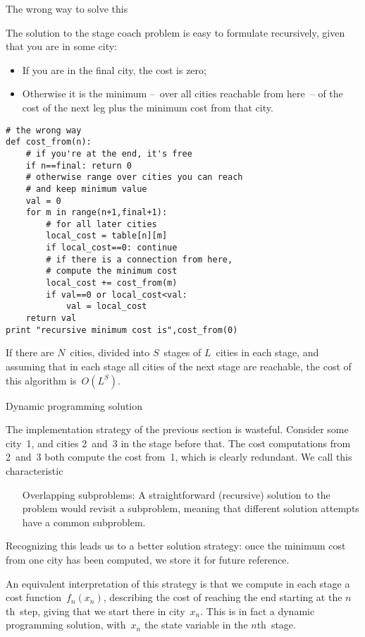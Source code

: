  {The wrong way to solve this}

The solution to the stage coach problem is easy to formulate
recursively, given that you are in some city:
\begin{itemize}
\item If you are in the final city, the cost is zero;
\item Otherwise it is the minimum --~over all cities reachable from here~--
  of the cost of the next leg plus the minimum cost from that city.
\end{itemize}

\begin{verbatim}
# the wrong way
def cost_from(n):
    # if you're at the end, it's free
    if n==final: return 0
    # otherwise range over cities you can reach
    # and keep minimum value
    val = 0
    for m in range(n+1,final+1):
        # for all later cities
        local_cost = table[n][m]
        if local_cost==0: continue
        # if there is a connection from here,
        # compute the minimum cost
        local_cost += cost_from(m)
        if val==0 or local_cost<val:
            val = local_cost
    return val
print "recursive minimum cost is",cost_from(0)
\end{verbatim}
If there are $N$~cities, divided into $S$~stages of $L$~cities in each
stage, and assuming that in each stage all cities of the next stage are
reachable, the cost of this algorithm is~$O(L^S)$. 

 {Dynamic programming solution}

The implementation strategy of the previous section is
wasteful. Consider some city~1, and cities 2~and~3 in the stage before
that. The cost computations from 2~and~3 both compute the cost from~1,
which is clearly redundant. We call this characteristic
\begin{itemize}
\item[Overlapping subproblems:] A
  straightforward (recursive) solution to the problem would revisit a
  subproblem, meaning that different solution attempts have a common
  subproblem.
\end{itemize}
Recognizing this leads us to a better solution strategy: once the
minimum cost from one city has been computed, we store it for future
reference.

An equivalent interpretation of this strategy is that we compute in
each stage a cost function~$f_n(x_n)$, describing the cost of reaching
the end starting at the $n$th~step, giving that we start there in city~$x_n$.
This is in
fact a dynamic programming solution, with~$x_n$ the state variable in
the $n$th~stage.

